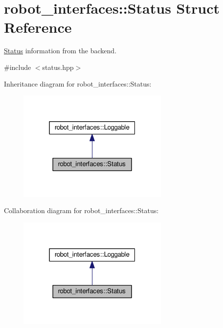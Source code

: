 \hypertarget{structrobot__interfaces_1_1Status}{}\section{robot\+\_\+interfaces\+:\+:Status Struct Reference}
\label{structrobot__interfaces_1_1Status}


\hyperlink{structrobot__interfaces_1_1Status}{Status} information from the backend.  




{\ttfamily \#include $<$status.\+hpp$>$}



Inheritance diagram for robot\+\_\+interfaces\+:\+:Status\+:
\nopagebreak
\begin{figure}[H]
\begin{center}
\leavevmode
\includegraphics[width=211pt]{structrobot__interfaces_1_1Status__inherit__graph}
\end{center}
\end{figure}


Collaboration diagram for robot\+\_\+interfaces\+:\+:Status\+:
\nopagebreak
\begin{figure}[H]
\begin{center}
\leavevmode
\includegraphics[width=211pt]{structrobot__interfaces_1_1Status__coll__graph}
\end{center}
\end{figure}
